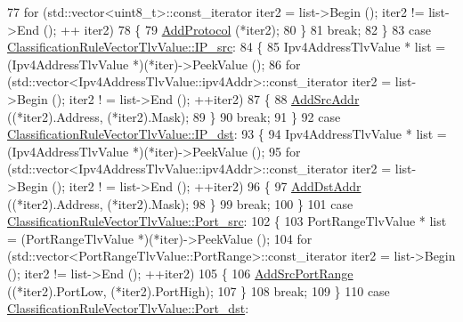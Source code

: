 \begin{DoxyCode}
77             \textcolor{keywordflow}{for} (std::vector<uint8\_t>::const\_iterator iter2 = list->Begin (); iter2 != list->End (); ++
      iter2)
78               \{
79                 \hyperlink{classns3_1_1IpcsClassifierRecord_af1a805afc2c131b82ef0ecc67d1f3b0d}{AddProtocol} (*iter2);
80               \}
81             \textcolor{keywordflow}{break};
82           \}
83         \textcolor{keywordflow}{case} \hyperlink{classns3_1_1ClassificationRuleVectorTlvValue_a9945c44c631de44d3b9c8dc9560cb820a25dcc2e936d897953dd8fced923caa83}{ClassificationRuleVectorTlvValue::IP\_src}:
84           \{
85             Ipv4AddressTlvValue * list = (Ipv4AddressTlvValue *)(*iter)->PeekValue ();
86             \textcolor{keywordflow}{for} (std::vector<Ipv4AddressTlvValue::ipv4Addr>::const\_iterator iter2 = list->Begin (); iter2 !
      = list->End (); ++iter2)
87               \{
88                 \hyperlink{classns3_1_1IpcsClassifierRecord_aea39f328af19bd0a7462053e124d965d}{AddSrcAddr} ((*iter2).Address, (*iter2).Mask);
89               \}
90             \textcolor{keywordflow}{break};
91           \}
92         \textcolor{keywordflow}{case} \hyperlink{classns3_1_1ClassificationRuleVectorTlvValue_a9945c44c631de44d3b9c8dc9560cb820ab9d2ecb509415d656b9fecb6470a11d5}{ClassificationRuleVectorTlvValue::IP\_dst}:
93           \{
94             Ipv4AddressTlvValue * list = (Ipv4AddressTlvValue *)(*iter)->PeekValue ();
95             \textcolor{keywordflow}{for} (std::vector<Ipv4AddressTlvValue::ipv4Addr>::const\_iterator iter2 = list->Begin (); iter2 !
      = list->End (); ++iter2)
96               \{
97                 \hyperlink{classns3_1_1IpcsClassifierRecord_a69ec3e61c727e9995fe7b148f84b8dff}{AddDstAddr} ((*iter2).Address, (*iter2).Mask);
98               \}
99             \textcolor{keywordflow}{break};
100           \}
101         \textcolor{keywordflow}{case} \hyperlink{classns3_1_1ClassificationRuleVectorTlvValue_a9945c44c631de44d3b9c8dc9560cb820a9d8e7721917dc3136e20ca00dbe4b0ad}{ClassificationRuleVectorTlvValue::Port\_src}:
102           \{
103             PortRangeTlvValue * list = (PortRangeTlvValue *)(*iter)->PeekValue ();
104             \textcolor{keywordflow}{for} (std::vector<PortRangeTlvValue::PortRange>::const\_iterator iter2 = list->Begin (); iter2 !=
       list->End (); ++iter2)
105               \{
106                 \hyperlink{classns3_1_1IpcsClassifierRecord_a9678d242143b031e0f4c22bcdec17b56}{AddSrcPortRange} ((*iter2).PortLow, (*iter2).PortHigh);
107               \}
108             \textcolor{keywordflow}{break};
109           \}
110         \textcolor{keywordflow}{case} \hyperlink{classns3_1_1ClassificationRuleVectorTlvValue_a9945c44c631de44d3b9c8dc9560cb820a20c3a1510829e04b8f8857b536b77471}{ClassificationRuleVectorTlvValue::Port\_dst}:

\end{DoxyCode}
